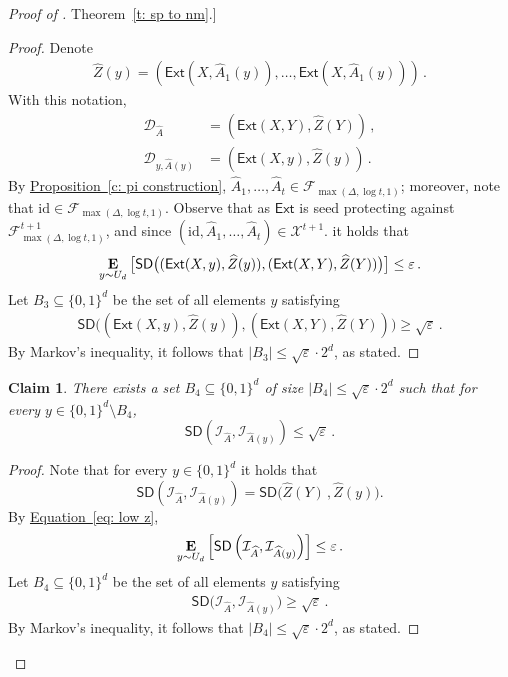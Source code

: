\documentclass[11pt]{article}
\numberwithin{equation}{section}
\newtheorem{claim}[theorem]{Claim}
\theoremstyle{definition}
\theoremstyle{plain}
\newcommand{\expref}[2]{\hyperref[#2]{#1~\ref{#2}}}
\newcommand{\expeqref}[2]{\hyperref[#2]{#1~\eqref{#2}}}
\newcommand{\ext}{\mathsf{Ext}}
\newcommand{\eps}{\varepsilon}
\newcommand{\nc}{\mathcal{X}}
\newcommand{\E}{\mathop{\bf E\/}}
\newcommand{\abs}[1]{\left\lvert #1\right\rvert}
\newcommand{\advfampart}{\mathcal{F}}
\def\SD{\ensuremath{\mathsf{SD}}}
\begin{document}
\begin{proof}[Proof of \expref{Theorem}{t: sp to nm}.]
\begin{proof}
	Denote 
	\begin{align*}
		\widehat{Z}(y) = \left(\ext(X,\widehat{A}_1(y)), \ldots, \ext(X,\widehat{A}_1(y))\right)\,.
	\end{align*}
	With this notation, 
	\begin{align*}
	\mathcal{D}_{\widehat{A}} &= \left( \ext(X,Y), \widehat{Z}(Y) \right)\,, \\
	\mathcal{D}_{y,\widehat{A}(y)} &= \left( \ext(X,y), \widehat{Z}(y) \right)\,.
	\end{align*}
%
	By \expref{Proposition}{c: pi construction}, $\widehat{A}_1,\ldots,\widehat{A}_t \in \advfampart_{\max(\Delta, \log t,1)}$; moreover, note that  $\mathrm{id} \in \advfampart_{\max(\Delta, \log t,1)}$. Observe that as $\ext$ is seed protecting against $\advfampart_{\max(\Delta, \log t,1)}^{t+1}$, and since $(\mathrm{id},\widehat{A}_1,\ldots,\widehat{A}_t) \in \nc^{t+1}$. it holds that %
	\begin{equation}\label{eq: low z}
	\E_{y\sim U_d}\big[\SD\big((\ext(X,y), \widehat{Z}(y)), (\ext(X,Y),\widehat{Z}(Y))\big)\big] \leq \eps\,.
	\end{equation}
	Let $B_3 \subseteq \{0,1\}^d$ be the set of all elements $y$ satisfying
	\begin{align*}
	\SD\big((\ext(X,y), \widehat{Z}(y)),(\ext(X,Y), \widehat{Z}(Y))\big) \geq \sqrt{\eps}\,.
	\end{align*}
	By Markov's inequality, it follows that $\abs{B_3} \leq \sqrt{\eps}\cdot 2^d$, as stated.
%
	
\end{proof}

\begin{claim}\label{claim:i is concentrated}
	There exists a set
	 $B_4 \subseteq \{0,1\}^d$ of size $\abs{B_4} \le \sqrt{\eps} \cdot 2^d$ such that for every $y \in \{0,1\}^d \setminus B_4$,
	\[
	\SD\left(\mathcal{I}_{\widehat{A}}, \mathcal{I}_{\widehat{A}(y)}\right) \le \sqrt{\eps}\,.
	\]
\end{claim}
\begin{proof}
	Note that for every $y \in \{0,1\}^d$ it holds that  
	\[
	\SD\left(\mathcal{I}_{\widehat{A}}, \mathcal{I}_{\widehat{A}(y)}\right) = \SD\big(\widehat{Z}(Y)\,, \widehat{Z}(y)\big).
	\]
	By \expeqref{Equation}{eq: low z},
	\[
	\E_{y\sim U_d}\left[\SD\left(\mathcal{I}_{\widehat{A}}, \mathcal{I}_{\widehat{A}(y)}\right)\right] \leq \eps\,.  
	\]
	Let $B_4 \subseteq \{0,1\}^d$ be the set of all elements $y$ satisfying
	\begin{align*}
	\SD\big(\mathcal{I}_{\widehat{A}}, \mathcal{I}_{\widehat{A}(y)}\big) \geq \sqrt{\eps}\,.
	\end{align*}
	By Markov's inequality, it follows that $\abs{B_4} \leq \sqrt{\eps}\cdot 2^d$, as stated.
\end{proof}



\end{proof}
\end{document}
